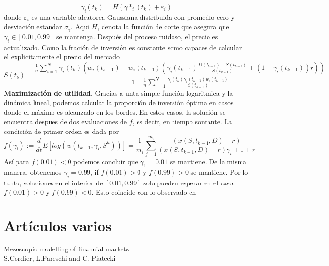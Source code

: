 \documentclass[12pt,a4paper]{article}
\begin{document}
$$
\gamma_{i}(t_k)=H(\gamma*_{i}(t_k)+\varepsilon_i)
$$
donde $\varepsilon_i$ es una variable aleatorea Gaussiana distribuida con promedio cero y desviación estandar $\sigma_\gamma$. Aqui $H$, denota la función de corte que asegura que $\gamma_i\in[0.01,0.99]$ se mantenga. Después del proceso ruidoso, el precio es actualizado. Como la fración de inversión es constante  somo capaces de calcular el explicitamente el precio del mercado
$$
S(t_k)=\frac{\frac{1}{n}\sum^{N}_{i=1}\gamma_{i}(t_k)\left( w_i(t_{k-1})+w_{i}(t_{k-1})(\gamma_i(t_{k-1})\frac{D(t_{k-1})-S(t_{k-1})}{S(t_{k-1})}+(1-\gamma_i(t_{k-1}))r)\right)}{1-\frac{1}{n}\sum^{N}_{i=1}\frac{\gamma_i(t_k)\gamma_i(t_{k-1})w_{i}(t_{k-1})}{S(t_{k-1})}}
$$
\textbf{Maximización de utilidad}. Gracias a unta simple función logaritmica y la dinámica lineal, podemos calcular la proporción de inversión óptima en casos donde el máximo es alcanzado en los bordes. En estos casos, la solución se encuentra despues de dos evaluaciones de $f$, es decir, en tiempo sontante. La condición de primer orden es dada por
$$
f(\gamma_i) := \frac{d}{dt}E[log(w(t_{k-1},\gamma_i,S^h))]=\frac{1}{m_i}\sum^{m_i}_{j=1}\frac{(x(S,t_{k-1},D)-r)}{(x(S, t_{k-1},D)-r)\gamma_i+1+r}
$$
Así para $f(0.01)<0$ podemos concluir que $\gamma_1
=0.01$ se mantiene. De la misma manera, obtenemos $\gamma_i=0.99$, if $f(0.01)>0$ y $f(0.99)>0$ se mantiene. Por lo tanto, soluciones en el interior de $[0.01,0.99]$ solo pueden esperar en el caso: $f(0.01)>0$ y $f(0.99)<0$. Esto coincide con lo observado en \citep{Samanidou2007} 
\newpage
\part{Artículos varios}
\begin{center}
Mesoscopic modelling of financial markets\\
S.Cordier, L.Pareschi and C. Piatecki
\citep{cordier2009}
\end{center}
\end{document}

